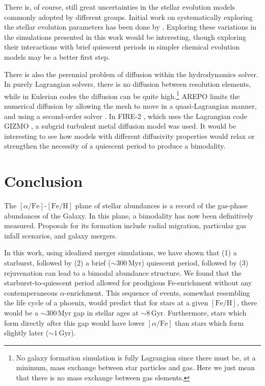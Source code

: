 \documentclass[linenumbers, twocolumn]{aastex631}
\newcommand{\Gyr}{\ensuremath{\textrm{Gyr}}}
\newcommand{\Myr}{\ensuremath{\textrm{Myr}}}
\newcommand{\FeH}{\ensuremath{[\textrm{Fe}/\textrm{H}]}}
\newcommand{\alphaFe}{\ensuremath{[\alpha/\textrm{Fe}]}}
\begin{document}
There is, of course, still great uncertainties in the stellar evolution models commonly adopted by different groups. Initial work on systematically exploring the stellar evolution parameters has been done by \citet{2017A&A...605A..59R,2021MNRAS.508.3365B}. Exploring these variations in the simulations presented in this work would be interesting, though exploring their interactions with brief quiescent periods in simpler chemical evolution models may be a better first step.

There is also the perennial problem of diffusion within the hydrodynamics solver. In purely Lagrangian solvers, there is no diffusion between resolution elements, while in Eulerian codes the diffusion can be quite high.\footnote{No galaxy formation simulation is fully Lagrangian since there must be, at a minimum, mass exchange between star particles and gas. Here we just mean that there is no mass exchange between gas elements.} AREPO limits the numerical diffusion by allowing the mesh to move in a quasi-Lagrangian manner, and using a second-order solver \citep{2010MNRAS.401..791S}. In FIRE-2 \citep{2018MNRAS.480..800H}, which uses the Lagrangian code GIZMO \citep{2015MNRAS.450...53H}, a subgrid turbulent metal diffusion model was used. It would be interesting to see how models with different diffusivity properties would relax or strengthen the necessity of a quiescent period to produce a bimodality.

\section{Conclusion}\label{sec:conclusion}
The \alphaFe{}-\FeH{} plane of stellar abundances is a record of the gas-phase abundances of the Galaxy. In this plane, a bimodality has now been definitively measured. Proposals for its formation include radial migration, particular gas infall scenarios, and galaxy mergers.

In this work, using idealized merger simulations, we have shown that (1) a starburst, followed by (2) a brief ($\sim300\,\Myr$) quiescent period, followed by (3) rejuvenation can lead to a bimodal abundance structure. We found that the starburst-to-quiescent period allowed for prodigious Fe-enrichment without any contemperaneous $\alpha$-enrichment. This sequence of events, somewhat resembling the life cycle of a phoenix, would predict that for stars at a given \FeH{}, there would be a $\sim300\,\Myr$ gap in stellar ages at $\sim8\,\Gyr$. Furthermore, stars which form directly after this gap would have lower \alphaFe{} than stars which form slightly later ($\sim1\,\Gyr$).
\end{document}
